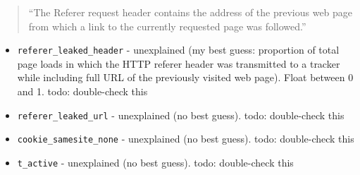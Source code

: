 \documentclass[
]{article}
\begin{document}
\begin{quote}
``The Referer request header contains the address of the previous web
page from which a link to the currently requested page was followed.''
\end{quote}

\begin{itemize}
\item
  \texttt{referer\_leaked\_header} - unexplained (my best guess:
  proportion of total page loads in which the HTTP referer header was
  transmitted to a tracker while including full URL of the previously
  visited web page). Float between 0 and 1. todo: double-check this
\item
  \texttt{referer\_leaked\_url} - unexplained (no best guess). todo:
  double-check this
\item
  \texttt{cookie\_samesite\_none} - unexplained (no best guess). todo:
  double-check this
\item
  \texttt{t\_active} - unexplained (no best guess). todo: double-check
  this
\end{itemize}
\end{document}
